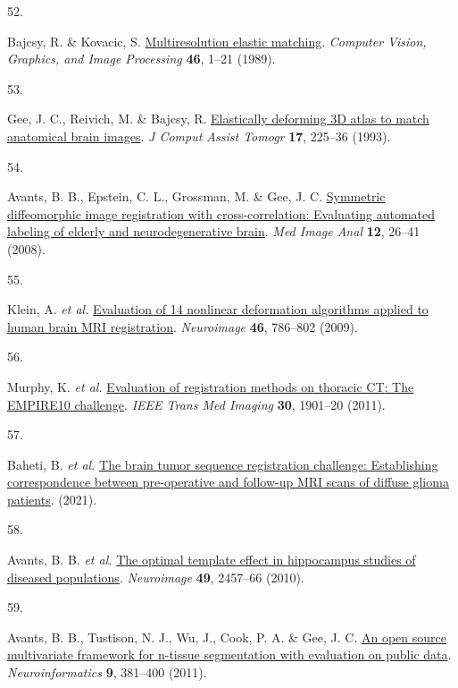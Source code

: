 \documentclass[
  12pt,
]{article}
\newlength{\cslhangindent}
\newlength{\csllabelwidth}
\newenvironment{CSLReferences}[2] %
 {\begin{list}{}{%
  \setlength{\itemindent}{0pt}
  \setlength{\leftmargin}{0pt}
  \setlength{\parsep}{0pt}
  \ifodd #1
   \setlength{\leftmargin}{\cslhangindent}
   \setlength{\itemindent}{-1\cslhangindent}
  \fi
  \setlength{\itemsep}{#2\baselineskip}}}
 {\end{list}}
\newcommand{\CSLLeftMargin}[1]{\parbox[t]{\csllabelwidth}{\strut#1\strut}}
\newcommand{\CSLRightInline}[1]{\parbox[t]{\linewidth - \csllabelwidth}{\strut#1\strut}}
\begin{document}
\begin{CSLReferences}{0}{0}
\CSLLeftMargin{52. }%
\CSLRightInline{Bajcsy, R. \& Kovacic, S.
\href{https://doi.org/10.1016/S0734-189X(89)80014-3}{Multiresolution
elastic matching}. \emph{Computer Vision, Graphics, and Image
Processing} \textbf{46}, 1--21 (1989).}

\CSLLeftMargin{53. }%
\CSLRightInline{Gee, J. C., Reivich, M. \& Bajcsy, R.
\href{https://www.ncbi.nlm.nih.gov/pubmed/8454749}{Elastically deforming
3D atlas to match anatomical brain images}. \emph{J Comput Assist
Tomogr} \textbf{17}, 225--36 (1993).}

\CSLLeftMargin{54. }%
\CSLRightInline{Avants, B. B., Epstein, C. L., Grossman, M. \& Gee, J.
C. \href{https://doi.org/10.1016/j.media.2007.06.004}{Symmetric
diffeomorphic image registration with cross-correlation: Evaluating
automated labeling of elderly and neurodegenerative brain}. \emph{Med
Image Anal} \textbf{12}, 26--41 (2008).}

\CSLLeftMargin{55. }%
\CSLRightInline{Klein, A. \emph{et al.}
\href{https://doi.org/10.1016/j.neuroimage.2008.12.037}{Evaluation of 14
nonlinear deformation algorithms applied to human brain {MRI}
registration}. \emph{Neuroimage} \textbf{46}, 786--802 (2009).}

\CSLLeftMargin{56. }%
\CSLRightInline{Murphy, K. \emph{et al.}
\href{https://doi.org/10.1109/TMI.2011.2158349}{Evaluation of
registration methods on thoracic {CT}: The {EMPIRE10} challenge}.
\emph{IEEE Trans Med Imaging} \textbf{30}, 1901--20 (2011).}

\CSLLeftMargin{57. }%
\CSLRightInline{Baheti, B. \emph{et al.}
\href{https://arxiv.org/abs/2112.06979}{The brain tumor sequence
registration challenge: Establishing correspondence between
pre-operative and follow-up MRI scans of diffuse glioma patients}.
(2021).}

\CSLLeftMargin{58. }%
\CSLRightInline{Avants, B. B. \emph{et al.}
\href{https://doi.org/10.1016/j.neuroimage.2009.09.062}{The optimal
template effect in hippocampus studies of diseased populations}.
\emph{Neuroimage} \textbf{49}, 2457--66 (2010).}

\CSLLeftMargin{59. }%
\CSLRightInline{Avants, B. B., Tustison, N. J., Wu, J., Cook, P. A. \&
Gee, J. C. \href{https://doi.org/10.1007/s12021-011-9109-y}{An open
source multivariate framework for n-tissue segmentation with evaluation
on public data}. \emph{Neuroinformatics} \textbf{9}, 381--400 (2011).}


\end{CSLReferences}
\end{document}
